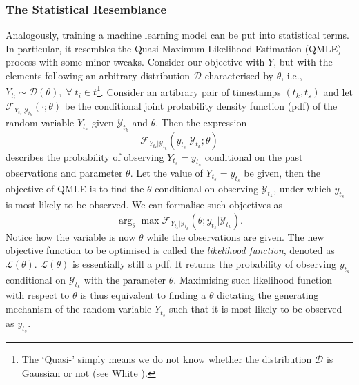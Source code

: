 \subsubsection{The Statistical Resemblance}
Analogously, training a machine learning model can be put into statistical terms. In particular, it resembles the Quasi-Maximum Likelihood Estimation (QMLE) process with some minor tweaks. Consider our objective with $Y$, but with the elements following an arbitrary distribution $\mathcal{D}$ characterised by $\theta$, i.e., $Y_{t_i} \sim \mathcal{D}(\theta), \; \forall \; t_i \in t$\footnote{The `Quasi-' simply means we do not know whether the distribution $\mathcal{D}$ is Gaussian or not (see White \citeyear{white1982maximum}).}. Consider an artibrary pair of timestamps $(t_k, t_s)$ and let $\mathcal{F}_{Y_{t_s} | \mathcal{Y}_{t_k}}(\cdot; \theta)$ be the conditional joint probability density function (pdf) of the random variable $Y_{t_s}$ given $\mathcal{Y}_{t_k}$ and $\theta$. Then the expression
\begin{equation*}
    \mathcal{F}_{Y_{t_s} | \mathcal{Y}_{t_k}}(y_{t_s}| \mathcal{Y}_{t_k} ; \theta)
\end{equation*}
describes the probability of observing $Y_{t_s} = y_{t_s}$ conditional on the past observations and parameter $\theta$. Let the value of $Y_{t_s} = y_{t_s}$ be given, then the objective of QMLE is to find the $\theta$ conditional on observing $\mathcal{Y}_{t_k}$, under which $y_{t_s}$ is most likely to be observed. We can formalise such objectives as
\begin{equation*}
    \arg_{\theta} \max \mathcal{F}_{Y_{t_s} | \mathcal{Y}_{t_k}}(\theta ; y_{t_s} | \mathcal{Y}_{t_k}).
\end{equation*}
Notice how the variable is now $\theta$ while the observations are given. The new objective function to be optimised is called the \textit{likelihood function}, denoted as $\mathcal{L}(\theta)$. $\mathcal{L}(\theta)$ is essentially still a pdf. It returns the probability of observing $y_{t_s}$ conditional on $\mathcal{Y}_{t_k}$ with the parameter $\theta$. Maximising such likelihood function with respect to $\theta$ is thus equivalent to finding a $\theta$ dictating the generating mechanism of the random variable $Y_{t_s}$ such that it is most likely to be observed as $y_{t_s}$.

